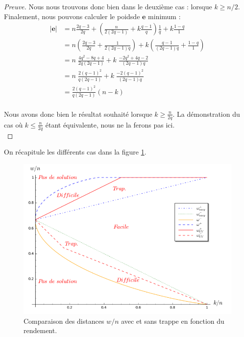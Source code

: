 \documentclass[12pt]{article}
\theoremstyle{plain}
\newcommand{\e}{\mathbf{e}}
\begin{document}
\begin{proof}[Preuve]
Nous nous trouvons donc bien dans le deuxième cas : lorsque $k \geq n/2$. Finalement, nous pouvons calculer le poidsde $\e$ minimum :
\begin{equation*}
\begin{split}
|\e| &= n\frac{2q-3}{2q} + \left(\frac{n}{2(2q-1)} + k\frac{q-1}{q}\right)\frac{1}{q}+ k \frac{1-q}{1}\\
&= n\left(\frac{2q-3}{2q} + \frac{1}{2(2q-1)q}\right) + k\left(\frac{q-1}{(2q-1)q}+ \frac{1-q}{1}\right)\\
&= n\;\frac{4q^2-8q+4}{2q(2q-1)} + k\;\frac{-2q^2+4q-2}{(2q-1)q}\\
&= n\;\frac{2(q-1)^2}{q(2q-1)} + k\;\frac{-2(q-1)^2}{(2q-1)q}\\
&= \frac{2(q-1)^2}{q(2q-1)}(n-k)\\
\end{split}
\end{equation*}

\noindent Nous avons donc bien le résultat souhaité lorsque $ k \geq \frac{n}{2q}$. La démonstration du cas où $k \leq \frac{n}{2q}$ étant équivalente, nous ne la ferons pas ici.\\

\end{proof}

\noindent On récapitule les différents cas dans la figure \ref{graphique ratio}. \\

\begin{figure}[h]
\begin{center}
\includegraphics [scale=0.4]{include/graph_ratio_w.png}
\end{center}
\caption{\small Comparaison des distances $w/n$ avec et sans trappe en fonction du rendement.}
\label{graphique ratio}
\end{figure}
\end{document}

